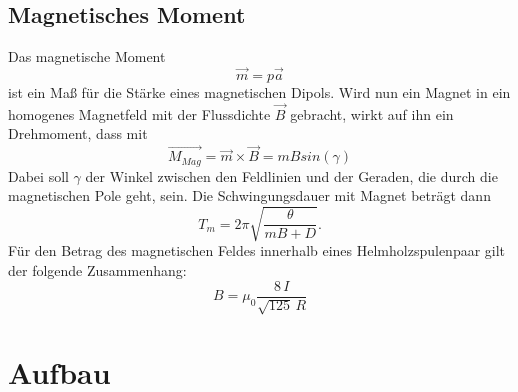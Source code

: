 \documentclass[11pt,ngerman,a4paper]{article}
\begin{document}
\subsection{Magnetisches Moment}
Das magnetische Moment
\begin{equation}
\label{9}
\vec{m}=p\vec{a} 
\end{equation}
ist ein Maß für die Stärke eines magnetischen Dipols. Wird nun ein Magnet in ein homogenes Magnetfeld mit der Flussdichte $\vec{B}$  gebracht, wirkt auf ihn ein Drehmoment, dass mit
\begin{equation}
\label{10}
\vec{M_{Mag}}=\vec{m} \times \vec{B} = m B sin(\gamma)
\end{equation}
Dabei soll $\gamma$ der Winkel zwischen den Feldlinien und der Geraden, die durch die magnetischen Pole geht, sein.
Die Schwingungsdauer mit Magnet beträgt dann
\begin{equation}
\label{11}
T_m=2\pi \sqrt{\frac{\theta}{mB+D}}.
\end{equation}
Für den Betrag des magnetischen Feldes innerhalb eines Helmholzspulenpaar gilt der folgende Zusammenhang:
\begin{equation}
B = \mu_0 \frac{8\,I}{\sqrt{125}\,R} 
\label{helm}
\end{equation}
\section{Aufbau}
\end{document}
